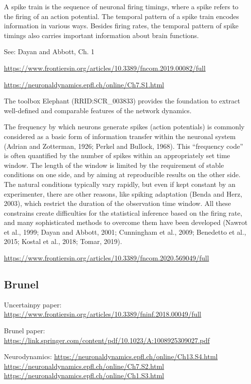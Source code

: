 A spike train is the sequence of neuronal firing timings, where a spike refers to the firing of an action potential. The temporal pattern of a spike train encodes information in various ways. Besides firing rates, the temporal pattern of spike timings also carries important information about brain functions. 

See: Dayan and Abbott, Ch. 1

\url{https://www.frontiersin.org/articles/10.3389/fncom.2019.00082/full}

\url{https://neuronaldynamics.epfl.ch/online/Ch7.S1.html}

The toolbox Elephant (RRID:SCR\_003833) provides the foundation to extract well-defined and comparable features of the network dynamics. 

The frequency by which neurons generate spikes (action potentials) is commonly considered as a basic form of information transfer within the neuronal system (Adrian and Zotterman, 1926; Perkel and Bullock, 1968). This “frequency code” is often quantified by the number of spikes within an appropriately set time window. The length of the window is limited by the requirement of stable conditions on one side, and by aiming at reproducible results on the other side. The natural conditions typically vary rapidly, but even if kept constant by an experimenter, there are other reasons, like spiking adaptation (Benda and Herz, 2003), which restrict the duration of the observation time window. All these constrains create difficulties for the statistical inference based on the firing rate, and many sophisticated methods to overcome them have been developed (Nawrot et al., 1999; Dayan and Abbott, 2001; Cunningham et al., 2009; Benedetto et al., 2015; Kostal et al., 2018; Tomar, 2019).

\url{https://www.frontiersin.org/articles/10.3389/fncom.2020.569049/full}

\subsection{Brunel}

Uncertainpy paper:
\url{https://www.frontiersin.org/articles/10.3389/fninf.2018.00049/full}

Brunel paper: 
\url{https://link.springer.com/content/pdf/10.1023/A:1008925309027.pdf} 

Neurodynamics: 
\url{https://neuronaldynamics.epfl.ch/online/Ch13.S4.html}
\url{https://neuronaldynamics.epfl.ch/online/Ch7.S2.html}
\url{https://neuronaldynamics.epfl.ch/online/Ch1.S3.html}



